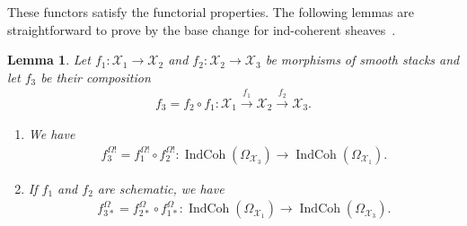 \documentclass [11pt,oneside,a4paper,mathscr]{amsart}
\newtheorem{lemma}[thm]{Lemma}
\theoremstyle{definition}
\newcommand{\X}{\mathcal{X}}
\newcommand{\IndCoh}{\operatorname{IndCoh}}
\begin{document}
These functors satisfy the functorial properties. 
The following lemmas are straightforward to prove 
by the base change for ind-coherent sheaves~\cite[Corollary~3.7.14]{MR3037900}. 
\begin{lemma}\label{lem:funct}
Let $f_1 \colon \X_1 \to \X_2$ and $f_2\colon \X_2 \to \X_3$ be 
morphisms of smooth stacks and let $f_3$ be their composition 
\begin{align*}
    f_3=f_2 \circ f_1 : 
    \X_1 \stackrel{f_1}{\to} \X_2 \stackrel{f_2}{\to} \X_3. 
\end{align*}
\begin{enumerate}
    \item 
    We have 
    \begin{align*}
        f_3^{\Omega!}=f_1^{\Omega!} \circ f_2^{\Omega !} \colon \IndCoh(\Omega_{\X_3}) \to 
        \IndCoh(\Omega_{\X_1}). 
    \end{align*}
\item If $f_1$ and $f_2$ are schematic, we have 
\begin{align*}
        f_{3*}^{\Omega}=f_{2*}^{\Omega} \circ f_{1*}^{\Omega} \colon \IndCoh(\Omega_{\X_1}) \to 
        \IndCoh(\Omega_{\X_3}). 
    \end{align*}
\end{enumerate}
\end{lemma}
\end{document}
